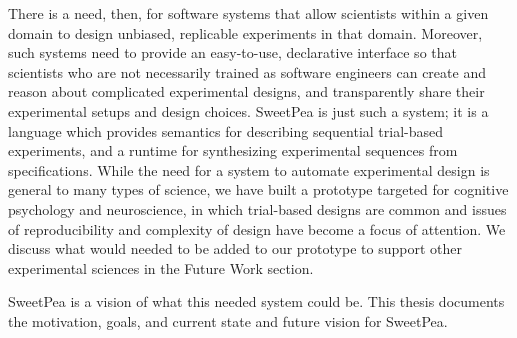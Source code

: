 There is a need, then, for software systems that allow scientists within a given domain to design unbiased, replicable experiments in that domain. Moreover, such systems need to provide an easy-to-use, declarative interface so that scientists who are not necessarily trained as software engineers can create and reason about complicated experimental designs, and transparently share their experimental setups and design choices. SweetPea is just such a system; it is a language which provides semantics for describing sequential trial-based experiments, and a runtime for synthesizing experimental sequences from specifications. While the need for a system to automate experimental design is general to many types of science, we have built a prototype targeted for cognitive psychology and neuroscience, in which trial-based designs are common and issues of reproducibility and complexity of design have become a focus of attention. We discuss what would needed to be added to our prototype to support other experimental sciences in the Future Work section.

SweetPea is a vision of what this needed system could be. This thesis documents the motivation, goals, and current state and future vision for SweetPea.




